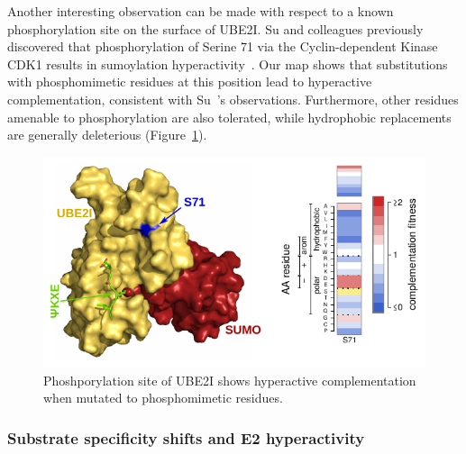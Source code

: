 Another interesting observation can be made with respect to a known phosphorylation site on the surface of UBE2I. Su and colleagues previously discovered that phosphorylation of Serine 71 via the Cyclin-dependent Kinase CDK1 results in sumoylation hyperactivity~\cite{su_phosphorylation_2012}. Our map shows that substitutions with phosphomimetic residues at this position lead to hyperactive complementation, consistent with Su~\etal's observations. Furthermore, other residues amenable to phosphorylation are also tolerated, while hydrophobic replacements are generally deleterious (Figure~\ref{fig:phosphosite}).


\begin{figure}
	\centering
	\includegraphics[width=\textwidth]{img/phosphosite.pdf}
	\caption{Phoshporylation site of UBE2I shows hyperactive complementation when mutated to phosphomimetic residues.}
	\label{fig:phosphosite}
\end{figure}


\subsubsection{Substrate specificity shifts and E2 hyperactivity}

